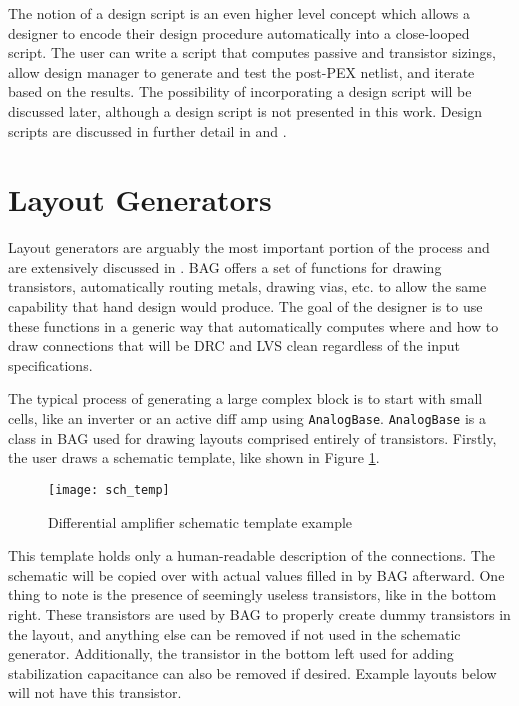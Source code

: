 The notion of a design script is an even higher level concept which allows a designer to encode their design procedure automatically into a close-looped script. The user can write a script that computes passive and transistor sizings, allow design manager to generate and test the post-PEX netlist, and iterate based on the results. The possibility of incorporating a design script will be discussed later, although a design script is not presented in this work. Design scripts are discussed in further detail in \cite{chang_bag2:_2018} and \cite{hakhamaneshi_late_nodate}.

\section{Layout Generators}
Layout generators are arguably the most important portion of the process and are extensively discussed in \cite{chang_bag2:_2018}. BAG offers a set of functions for drawing transistors, automatically routing metals, drawing vias, etc. to allow the same capability that hand design would produce. The goal of the designer is to use these functions in a generic way that automatically computes where and how to draw connections that will be DRC and LVS clean regardless of the input specifications. 

The typical process of generating a large complex block is to start with small cells, like an inverter or an active diff amp using \texttt{AnalogBase}. \texttt{AnalogBase} is a class in BAG used for drawing layouts comprised entirely of transistors. Firstly, the user draws a schematic template, like shown in Figure \ref{fig:sch_templ}.
\begin{figure}[h]
\centering
\texttt{[image: sch\_temp]}
\caption{Differential amplifier schematic template example}
\label{fig:sch_templ}
\end{figure}
\clearpage
This template holds only a human-readable description of the connections. The schematic will be copied over with actual values filled in by BAG afterward. One thing to note is the presence of seemingly useless transistors, like in the bottom right. These transistors are used by BAG to properly create dummy transistors in the layout, and anything else can be removed if not used in the schematic generator. Additionally, the transistor in the bottom left used for adding stabilization capacitance can also be removed if desired. Example layouts below will not have this transistor.

